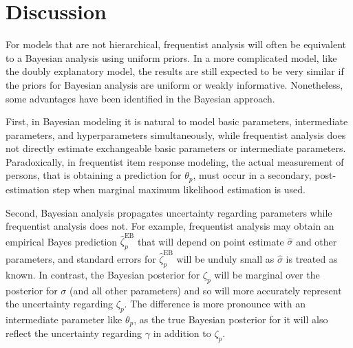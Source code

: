 \documentclass[12pt, letterpaper]{article}
\begin{document}
\section{Discussion}

For models that are not hierarchical, frequentist analysis will often be equivalent to a Bayesian analysis using uniform priors. In a more complicated model, like the doubly explanatory model, the results are still expected to be very similar if the priors for Bayesian analysis are uniform or weakly informative. Nonetheless, some advantages have been identified in the Bayesian approach.

First, in Bayesian modeling it is natural to model basic parameters, intermediate parameters, and hyperparameters simultaneously, while frequentist analysis does not directly estimate exchangeable basic parameters or intermediate parameters. Paradoxically, in frequentist item response modeling, the actual measurement of persons, that is obtaining a prediction for $\theta_p$, must occur in a secondary, post-estimation step when marginal maximum likelihood estimation is used.

Second, Bayesian analysis propagates uncertainty regarding parameters while frequentist analysis does not. For example, frequentist analysis may obtain an empirical Bayes prediction $\hat \zeta_p^\mathrm{EB}$ that will depend on point estimate $\hat \sigma$ and other parameters, and standard errors for $\hat \zeta_p^\mathrm{EB}$ will be unduly small as $\hat \sigma$ is treated as known. In contrast, the Bayesian posterior for $\zeta_p$ will be marginal over the posterior for $\sigma$ (and all other parameters) and so will more accurately represent the uncertainty regarding $\zeta_p$. The difference is more pronounce with an intermediate parameter like $\theta_p$, as the true Bayesian posterior for it will also reflect the uncertainty regarding $\gamma$ in addition to $\zeta_p$.


\printbibliography
\end{document}
